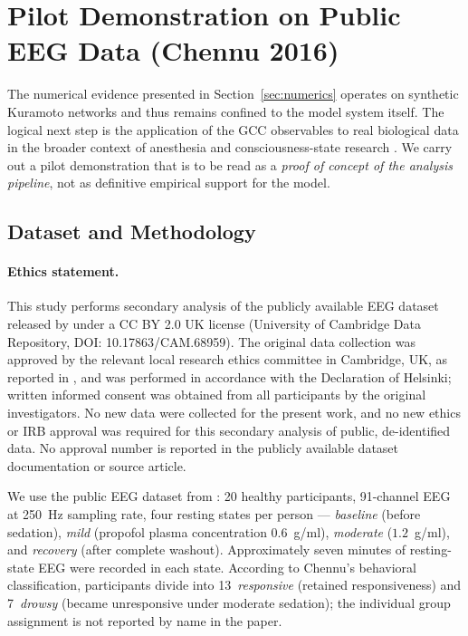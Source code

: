﻿\documentclass[11pt,a4paper]{article}
\theoremstyle{plain}
\theoremstyle{definition}
\theoremstyle{remark}
\begin{document}
\section{Pilot Demonstration on Public EEG Data (Chennu 2016)}
\label{sec:pilot}

The numerical evidence presented in Section~\ref{sec:numerics} operates on synthetic Kuramoto networks and thus remains confined to the model system itself. The logical next step is the application of the GCC observables to real biological data in the broader context of anesthesia and consciousness-state research \citep{alkire2008,purdon2013,sarasso2015}. We carry out a pilot demonstration that is to be read as a \emph{proof of concept of the analysis pipeline}, not as definitive empirical support for the model.

\subsection{Dataset and Methodology}

\paragraph{Ethics statement.} This study performs secondary analysis of the publicly available EEG dataset released by \citet{chennu2016} under a CC BY 2.0 UK license (University of Cambridge Data Repository, DOI: 10.17863/CAM.68959). The original data collection was approved by the relevant local research ethics committee in Cambridge, UK, as reported in \citet{chennu2016}, and was performed in accordance with the Declaration of Helsinki; written informed consent was obtained from all participants by the original investigators. No new data were collected for the present work, and no new ethics or IRB approval was required for this secondary analysis of public, de-identified data. No approval number is reported in the publicly available dataset documentation or source article.

We use the public EEG dataset from \citet{chennu2016}: 20 healthy participants, 91-channel EEG at 250~Hz sampling rate, four resting states per person --- \emph{baseline} (before sedation), \emph{mild} (propofol plasma concentration $0.6$~\textmu g/ml), \emph{moderate} ($1.2$~\textmu g/ml), and \emph{recovery} (after complete washout). Approximately seven minutes of resting-state EEG were recorded in each state. According to Chennu's behavioral classification, participants divide into 13~\emph{responsive} (retained responsiveness) and 7~\emph{drowsy} (became unresponsive under moderate sedation); the individual group assignment is not reported by name in the paper.
\end{document}
